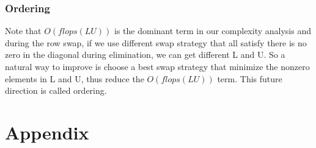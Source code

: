 \documentclass[11pt]{article}
\begin{document}
\subsubsection{Ordering}
Note that $O(flops(LU))$ is the dominant term in our complexity analysis and during the row swap, if we use different swap strategy that all satisfy there is no zero in the diagonal during elimination, we can get different L and U. So a natural way to improve is choose a best swap strategy that minimize the nonzero elements in L and U, thus reduce the  $O(flops(LU))$  term. This future direction is called ordering.

\section{Appendix}
\end{document}
